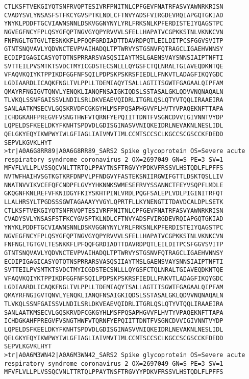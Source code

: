\begin{lstlisting}
CTLKSFTVEKGIYQTSNFRVQPTESIVRFPNITNLCPFGEVFNATRFASVYAWNRKRISN
CVADYSVLYNSASFSTFKCYGVSPTKLNDLCFTNVYADSFVIRGDEVRQIAPGQTGKIAD
YNYKLPDDFTGCVIAWNSNNLDSKVGGNYNYLYRLFRKSNLKPFERDISTEIYQAGSTPC
NGVEGFNCYFPLQSYGFQPTNGVGYQPYRVVVLSFELLHAPATVCGPKKSTNLVKNKCVN
FNFNGLTGTGVLTESNKKFLPFQQFGRDIADTTDAVRDPQTLEILDITPCSFGGVSVITP
GTNTSNQVAVLYQDVNCTEVPVAIHADQLTPTWRVYSTGSNVFQTRAGCLIGAEHVNNSY
ECDIPIGAGICASYQTQTNSPRRARSVASQSIIAYTMSLGAENSVAYSNNSIAIPTNFTI
SVTTEILPVSMTKTSVDCTMYICGDSTECSNLLLQYGSFCTQLNRALTGIAVEQDKNTQE
VFAQVKQIYKTPPIKDFGGFNFSQILPDPSKPSKRSFIEDLLFNKVTLADAGFIKQYGDC
LGDIAARDLICAQKFNGLTVLPPLLTDEMIAQYTSALLAGTITSGWTFGAGAALQIPFAM
QMAYRFNGIGVTQNVLYENQKLIANQFNSAIGKIQDSLSSTASALGKLQDVVNQNAQALN
TLVKQLSSNFGAISSVLNDILSRLDKVEAEVQIDRLITGRLQSLQTYVTQQLIRAAEIRA
SANLAATKMSECVLGQSKRVDFCGKGYHLMSFPQSAPHGVVFLHVTYVPAQEKNFTTAPA
ICHDGKAHFPREGVFVSNGTHWFVTQRNFYEPQIITTDNTFVSGNCDVVIGIVNNTVYDP
LQPELDSFKEELDKYFKNHTSPDVDLGDISGINASVVNIQKEIDRLNEVAKNLNESLIDL
QELGKYEQYIKWPWYIWLGFIAGLIAIVMVTIMLCCMTSCCSCLKGCCSCGSCCKFDEDD
SEPVLKGVKLHYT
>tr|A0A6G8RR89|A0A6G8RR89_SARS2 Spike glycoprotein OS=Severe acute respiratory syndrome coronavirus 2 OX=2697049 GN=S PE=3 SV=1
MFVFLVLLPLVSSQCVNLTTRTQLPPAYTNSFTRGVYYPDKVFRSSVLHSTQDLFLPFFS
NVTWFHAIHVSGTKGTKRFDNPVLPFNDGVYFASTEKSNIIRGWIFGTTLDSKTQSLLIV
NNATNVVIKVCEFQFCNDPFLGVYYHKNNKSWMESEFRVYSSANNCTFEYVSQPFLMDLE
GKQGNFKNLREFVFKNIDGYFKIYSKHTPINLVRDLPQGFSALEPLVDLPIGINITRFQT
LLALHRSYLTPGDSSSGWTAGAAAYYVGYLQPRTFLLKYNENGTITDAVDCALDPLSETK
CTLKSFTVEKGIYQTSNFRVQPTESIVRFPNITNLCPFGEVFNATRFASVYAWNRKRISN
CVADYSVLYNSASFSTFKCYGVSPTKLNDLCFTNVYADSFVIRGDEVRQIAPGQTGKIAD
YNYKLPDDFTGCVIAWNSNNLDSKVGGNYNYLYRLFRKSNLKPFERDISTEIYQAGSTPC
NGVEGFNCYFPLQSYGFQPTNGVGYQPYRVVVLSFELLHAPATVCGPKKSTNLVKNKCVN
FNFNGLTGTGVLTESNKKFLPFQQFGRDIADTTDAVRDPQTLEILDITPCSFGGVSVITP
GTNTSNQVAVLYQDVNCTEVPVAIHADQLTPTWRVYSTGSNVFQTRAGCLIGAEHVNNSY
ECDIPIGAGICASYQTQTNSPRRARSVASQSIIAYTMSLGAENSVAYSNNSIAIPTNFTI
SVTTEILPVSMTKTSVDCTMYICGDSTECSNLLLQYGSFCTQLNRALTGIAVEQDKNTQE
VFAQVKQIYKTPPIKDFGGFNFSQILPDPSKPSKRSFIEDLLFNKVTLADAGFIKQYGDC
LGDIAARDLICAQKFNGLTVLPPLLTDEMIAQYTSALLAGTITSGWTFGAGAALQIPFAM
QMAYRFNGIGVTQNVLYENQKLIANQFNSAIGKIQDSLSSTASALGKLQDVVNQNAQALN
TLVKQLSSNFGAISSVLNDILSRLDKVEAEVQIDRLITGRLQSLQTYVTQQLIRAAEIRA
SANLAATKMSECVLGQSKRVDFCGKGYHLMSFPQSAPHGVVFLHVTYVPAQEKNFTTAPA
ICHDGKAHFPREGVFVSNGTHWFVTQRNFYEPQIITTDNTFVSGNCDVVIGIVNNTVYDP
LQPELDSFKEELDKYFKNHTSPDVDLGDISGINASVVNIQKEIDRLNEVAKNLNESLIDL
QELGKYEQYIKWPWYIWLGFIAGLIAIVMVTIMLCCMTSCCSCLKGCCSCGSCCKFDEDD
SEPVLKGVKLHYT
>tr|A0A6M3WN42|A0A6M3WN42_SARS2 Spike glycoprotein OS=Severe acute respiratory syndrome coronavirus 2 OX=2697049 GN=S PE=3 SV=1
MFVFLVLLPLVSSQCVNLTTRTQLPPAYTNSFTRGVYYPDKVFRSSVLHSTQDLFLPFFS

\end{lstlisting}
